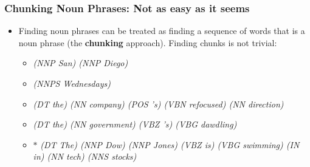 \begin{frame}
\frametitle{Chunking Noun Phrases: Not as easy as it seems}
\begin{itemize}
\item Finding noun phrases can be treated as finding a sequence of
words that is a noun phrase (the {\bf chunking} approach). 
Finding chunks is not trivial:
\begin{itemize}
\item {\em (NNP San) (NNP Diego)}
\item {\em (NNPS Wednesdays)}
\item {\em (DT the) (NN company) (POS 's) (VBN refocused) (NN direction)}
\item {\em (DT the) (NN government) (VBZ 's) (VBG dawdling)}
\item $\ast$ {\em (DT The) (NNP Dow) (NNP Jones) (VBZ is) (VBG swimming) (IN
  in) (NN tech) (NNS stocks)}
\end{itemize}
\end{itemize}

\end{frame}

